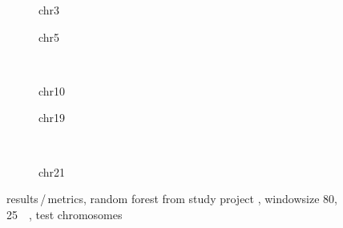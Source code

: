 \begin{figure}[p] %
    \begin{subfigure}{0.45\textwidth}
        \scriptsize
        \caption{chr3}
    \end{subfigure} \hfill
    \begin{subfigure}{0.45\textwidth}
        \scriptsize
        \caption{chr5}
    \end{subfigure}\\[5mm]
    \begin{subfigure}{0.45\textwidth}
        \scriptsize
        \caption{chr10}
    \end{subfigure}\hfill
    \begin{subfigure}{0.45\textwidth}
        \scriptsize
        \caption{chr19}
    \end{subfigure}\\[3mm]
    \centering
    \begin{subfigure}{0.45\textwidth}
        \scriptsize
        \caption{chr21}
    \end{subfigure} \hfill
    \caption{results\,/\,metrics, random forest from study project \cite{Krauth2020}, windowsize 80, \SI{25}{\kilo\bp}, test chromosomes}  \label{fig:results:randomforest_masterproject_pearson}
\end{figure}
